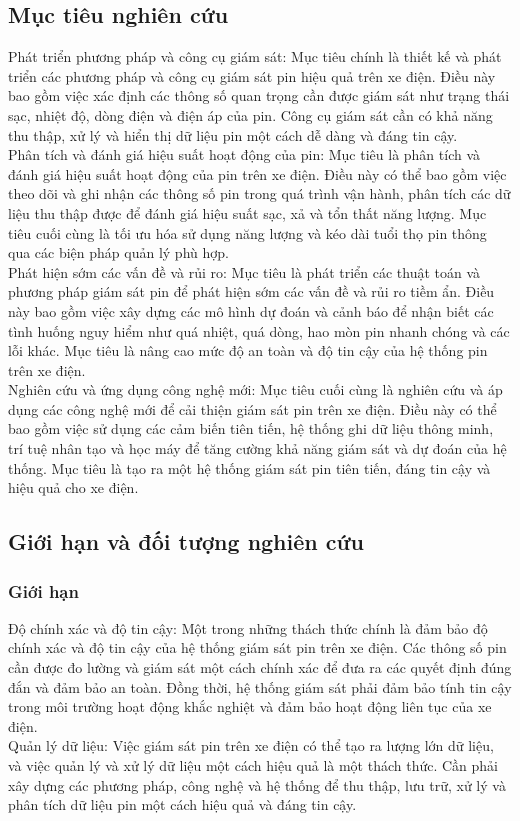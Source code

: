 \documentclass[a4paper,11pt]{article}
\theoremstyle{mytheor}
\begin{document}
\subsection{Mục tiêu nghiên cứu }
Phát triển phương pháp và công cụ giám sát: Mục tiêu chính là thiết kế và phát triển các phương pháp và công cụ giám sát pin hiệu quả trên xe điện. Điều này bao gồm việc xác định các thông số quan trọng cần được giám sát như trạng thái sạc, nhiệt độ, dòng điện và điện áp của pin. Công cụ giám sát cần có khả năng thu thập, xử lý và hiển thị dữ liệu pin một cách dễ dàng và đáng tin cậy.\\
Phân tích và đánh giá hiệu suất hoạt động của pin: Mục tiêu là phân tích và đánh giá hiệu suất hoạt động của pin trên xe điện. Điều này có thể bao gồm việc theo dõi và ghi nhận các thông số pin trong quá trình vận hành, phân tích các dữ liệu thu thập được để đánh giá hiệu suất sạc, xả và tổn thất năng lượng. Mục tiêu cuối cùng là tối ưu hóa sử dụng năng lượng và kéo dài tuổi thọ pin thông qua các biện pháp quản lý phù hợp.\\
Phát hiện sớm các vấn đề và rủi ro: Mục tiêu là phát triển các thuật toán và phương pháp giám sát pin để phát hiện sớm các vấn đề và rủi ro tiềm ẩn. Điều này bao gồm việc xây dựng các mô hình dự đoán và cảnh báo để nhận biết các tình huống nguy hiểm như quá nhiệt, quá dòng, hao mòn pin nhanh chóng và các lỗi khác. Mục tiêu là nâng cao mức độ an toàn và độ tin cậy của hệ thống pin trên xe điện.\\
Nghiên cứu và ứng dụng công nghệ mới: Mục tiêu cuối cùng là nghiên cứu và áp dụng các công nghệ mới để cải thiện giám sát pin trên xe điện. Điều này có thể bao gồm việc sử dụng các cảm biến tiên tiến, hệ thống ghi dữ liệu thông minh, trí tuệ nhân tạo và học máy để tăng cường khả năng giám sát và dự đoán của hệ thống. Mục tiêu là tạo ra một hệ thống giám sát pin tiên tiến, đáng tin cậy và hiệu quả cho xe điện.

\subsection{Giới hạn và đối tượng nghiên cứu }
\subsubsection{Giới hạn}
Độ chính xác và độ tin cậy: Một trong những thách thức chính là đảm bảo độ chính xác và độ tin cậy của hệ thống giám sát pin trên xe điện. Các thông số pin cần được đo lường và giám sát một cách chính xác để đưa ra các quyết định đúng đắn và đảm bảo an toàn. Đồng thời, hệ thống giám sát phải đảm bảo tính tin cậy trong môi trường hoạt động khắc nghiệt và đảm bảo hoạt động liên tục của xe điện.\\
Quản lý dữ liệu: Việc giám sát pin trên xe điện có thể tạo ra lượng lớn dữ liệu, và việc quản lý và xử lý dữ liệu một cách hiệu quả là một thách thức. Cần phải xây dựng các phương pháp, công nghệ và hệ thống để thu thập, lưu trữ, xử lý và phân tích dữ liệu pin một cách hiệu quả và đáng tin cậy.
\end{document}

